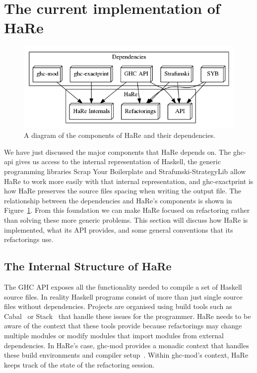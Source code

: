 \section{The current implementation of HaRe}
\label{hareCurr}

\begin{figure}[t]
	\begin{center}
		\includegraphics[scale=.4]{graphVis/Chapter2/hareDesign.png}
	\end{center}
	\caption{A diagram of the components of HaRe and their dependencies.}
	\label{design}
\end{figure}

We have just discussed the major components that HaRe depends on. The ghc-api gives us access to the internal representation of Haskell, the generic programming libraries Scrap Your Boilerplate and Strafunski-StrategyLib allow HaRe to work more easily with that internal representation, and ghc-exactprint is how HaRe preserves the source files spacing when writing the output file. The relationship between the dependencies and HaRe's components is shown in Figure~\ref{design}. From this foundation we can make HaRe focused on refactoring rather than solving these more generic problems. This section will discuss how HaRe is implemented, what its API provides, and some general conventions that its refactorings use.

\subsection{The Internal Structure of HaRe}
\label{hareInners}

The GHC API exposes all the functionality needed to compile a set of Haskell source files. In reality Haskell programs consist of more than just single source files without dependencies. Projects are organised using build tools such as Cabal~\citep{cabal} or Stack~\citep{stack} that handle these issues for the programmer. HaRe needs to be aware of the context that these tools provide because refactorings may change multiple modules or modify modules that import modules from external dependencies. In HaRe's case, ghc-mod provides a monadic context that handles these build environments and compiler setup~\citep{ghcMod}. Within ghc-mod's context, HaRe keeps track of the state of the refactoring session.

